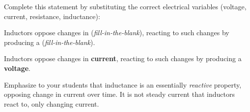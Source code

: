 

Complete this statement by substituting the correct electrical variables (voltage, current, resistance, inductance):

\vskip 10pt {\narrower \noindent \baselineskip5pt
Inductors oppose changes in ({\it fill-in-the-blank}), reacting to such changes by producing a ({\it fill-in-the-blank}).
\par} \vskip 10pt







Inductors oppose changes in {\bf current}, reacting to such changes by producing a {\bf voltage}.







Emphasize to your students that inductance is an essentially {\it reactive} property, opposing change in current over time.  It is not steady current that inductors react to, only changing current.





